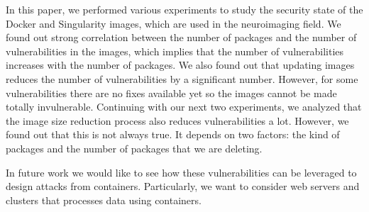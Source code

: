 \documentclass[a4paper,num-refs]{oup-contemporary}
\begin{document}
In this paper, we performed various experiments to study the security state of the Docker
and Singularity images, which are used in the neuroimaging field. We found out strong correlation
between the number of packages and the number of vulnerabilities in the images, which implies
that the number of vulnerabilities increases with the number of packages. We also found out that
updating images reduces the number of vulnerabilities by a significant number. However, for some
vulnerabilities there are no fixes available yet so the images cannot 
be made totally invulnerable. Continuing with our next two experiments, we analyzed that the
image size reduction process also reduces vulnerabilities a lot. However, we found out that this is not
always true. It depends on two factors: the kind of packages and the number of packages that we are
deleting.

In future work we would like to see how these vulnerabilities can be leveraged
to design attacks from containers. Particularly, we want
to consider web servers and clusters that processes data using containers.


\end{document}
